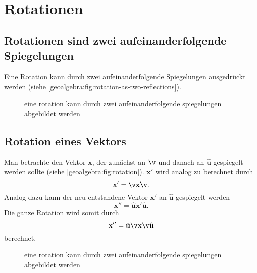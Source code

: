 \section{Rotationen}
\renewcommand{\u}{\hat{\mathbf{u}}}
\subsection{Rotationen sind zwei aufeinanderfolgende Spiegelungen}
Eine Rotation kann durch zwei aufeinanderfolgende Spiegelungen ausgedrückt werden (siehe
\autoref{geoalgebra:fig:rotation-as-two-reflections}).
\begin{figure}
  \begin{center}

  \end{center}
  \caption{eine rotation kann durch zwei aufeinanderfolgende spiegelungen abgebildet werden}
\label{geoalgebra:fig:rotation-as-two-reflections}
\end{figure}

\subsection{Rotation eines Vektors}
Man betrachte den Vektor $\mathbf{x}$, der zunächst an $\v$ und danach an $\u$ gespiegelt werden
sollte (siehe \autoref{geoalgebra:fig:rotation}). $\mathbf{x}'$ wird analog zu berechnet durch
\begin{equation}
\mathbf{x}' = \v \mathbf{x} \v.
\end{equation}
Analog dazu kann der neu entstandene Vektor $\mathbf{x}'$ an $\u$ gespiegelt werden
\begin{equation}
\mathbf{x}'' = \u \mathbf{x}' \u.
\end{equation}
Die ganze Rotation wird somit durch
\begin{equation}
\mathbf{x}'' = \u \v \mathbf{x} \v \u
\end{equation}
berechnet.
\begin{figure}
  \begin{center}

  \end{center}
  \caption{eine rotation kann durch zwei aufeinanderfolgende spiegelungen abgebildet werden}
\label{geoalgebra:fig:rotation}
\end{figure}


